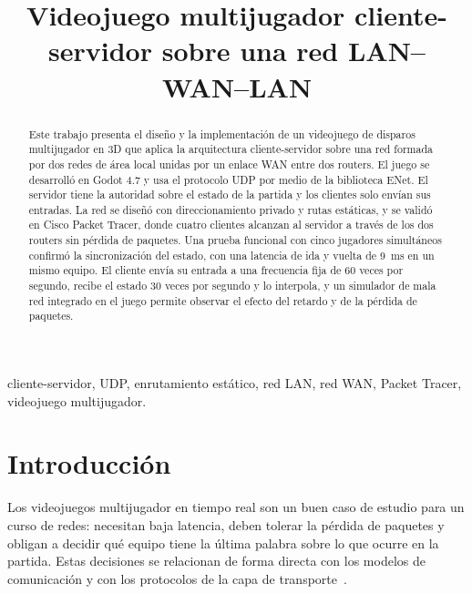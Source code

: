 \documentclass[conference]{IEEEtran}
\begin{document}
\title{Videojuego multijugador cliente-servidor sobre una red LAN--WAN--LAN}

\author{
}

\maketitle

\begin{abstract}
Este trabajo presenta el diseño y la implementación de un videojuego de disparos
multijugador en 3D que aplica la arquitectura cliente-servidor sobre una red
formada por dos redes de área local unidas por un enlace WAN entre dos routers.
El juego se desarrolló en Godot 4.7 y usa el protocolo UDP por medio de la
biblioteca ENet. El servidor tiene la autoridad sobre el estado de la partida y
los clientes solo envían sus entradas. La red se diseñó con direccionamiento
privado y rutas estáticas, y se validó en Cisco Packet Tracer, donde cuatro
clientes alcanzan al servidor a través de los dos routers sin pérdida de
paquetes. Una prueba funcional con cinco jugadores simultáneos confirmó la
sincronización del estado, con una latencia de ida y vuelta de 9~ms en un mismo
equipo. El cliente envía su entrada a una frecuencia fija de 60 veces por
segundo, recibe el estado 30 veces por segundo y lo interpola, y un simulador
de mala red integrado en el juego permite observar el efecto del retardo y de
la pérdida de paquetes.
\end{abstract}

\begin{IEEEkeywords}
cliente-servidor, UDP, enrutamiento estático, red LAN, red WAN, Packet Tracer,
videojuego multijugador.
\end{IEEEkeywords}

\section{Introducción}
Los videojuegos multijugador en tiempo real son un buen caso de estudio para un
curso de redes: necesitan baja latencia, deben tolerar la pérdida de paquetes y
obligan a decidir qué equipo tiene la última palabra sobre lo que ocurre en la
partida. Estas decisiones se relacionan de forma directa con los modelos de
comunicación y con los protocolos de la capa de transporte~\cite{kurose}.
\end{document}

